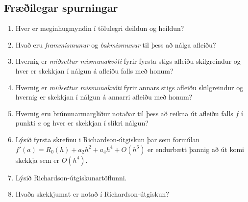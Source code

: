 \documentclass[icelandic,a4paper,12pt]{article}
\begin{document}
\subsection{Fræðilegar spurningar}
  \begin{enumerate}
  \item  Hver er meginhugmyndin í tölulegri deildun og heildun?
  \item  Hvað eru {\it frammismunur} og {\it bakmismunur} til þess að
    nálga afleiðu?
  \item  Hvernig er {\it miðsettur mismunakvóti} fyrir fyrsta stigs
    afleiðu skilgreindur og hver 
    er skekkjan í nálgun á afleiðu falls með honum?
  \item  Hvernig er {\it miðsettur mismunakvóti} fyrir annars stigs
    afleiðu skilgreindur og hvernig er skekkjan í nálgun á annarri
    afleiðu með honum?
  \item  Hvernig eru  brúnunarmargliður notaðar til þess að
    reikna út afleiðu falls $f$ í punkti $a$ og hver er skekkjan í
    slíkri nálgun?
  \item  Lýsið fyrsta skrefinu i Richardson-útgiskun þar sem 
formúlan $f'(a)=R_0(h)+a_2h^2+a_4h^4+O(h^6)$ er endurbætt þannig að út
komi skekkja sem er $O(h^4)$.
  \item  Lýsið Richardson-útgiskunartöflunni. 
  \item  Hvaða skekkjumat er notað í Richardson-útgiskun?
  \end{enumerate}
\end{document}
